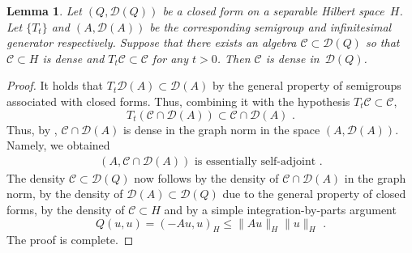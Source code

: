 \documentclass[11pt,letterpaper]{amsart}
\newcommand{\dom}[1]{\mathcal D(#1)}
\newcommand{\comma}{\,\,\mathrm{,}\;\,}
\newcommand{\fstop}{\,\,\mathrm{.}}
\newcommand{\purple}[1]{{\color{purple}#1}}
\newcommand{\E}{\mathcal E}
\renewcommand{\1}{\mathbf 1}
\numberwithin{equation}{section}
\theoremstyle{plain}
\newtheorem{lem}[thm]{Lemma}%
\theoremstyle{definition}
\theoremstyle{remark}
\begin{document}
\begin{appendix}
  \begin{lem} \label{l:MU}
Let $(Q, \dom{Q})$ be a closed form on a separable Hilbert space~$H$. Let $\{T_t\}$ and $(A, \dom{A})$ be the corresponding semigroup and infinitesimal generator respectively. Suppose that there exists an algebra $\mathcal C \subset \dom{Q}$ so that $\mathcal C \subset H$ is dense and $T_t \mathcal C \subset \mathcal C$ for any $t>0$.
Then $\mathcal C$ is dense in~$\dom{Q}$.
\end{lem}
\begin{proof}
It holds that $T_{t}\dom{A} \subset \dom{A}$ by the general property of semigroups associated with closed forms. Thus,  combining it with the hypothesis $T_t \mathcal C \subset \mathcal C$, 
$$ T_{t}(\mathcal C \cap \dom{A}) \subset \mathcal C \cap \dom{A}\fstop$$
 Thus, by \cite[Thm.~X.49]{ReeSim75}, $\mathcal C \cap \dom{A}$ is dense in the graph norm in the space $(A, \dom{A})$. Namely, we obtained
 \begin{align*} 
 \text{$(A, \mathcal C \cap \dom{A})$ is essentially self-adjoint} \fstop
 \end{align*}
The density $\mathcal C \subset \dom{Q}$ now follows by the density of $\mathcal C \cap \dom{A}$ in the graph norm, by the density of $\dom{A} \subset \dom{Q}$ due to the general property of closed forms, by the density of $\mathcal C \subset H$ and by a simple integration-by-parts argument
 $$Q(u,u) = (-A u, u)_{H} \le \|A u\|_{H}\|u\|_{H} \fstop$$
 The proof is complete. 
  \end{proof}
% 

\end{appendix}
\end{document}
